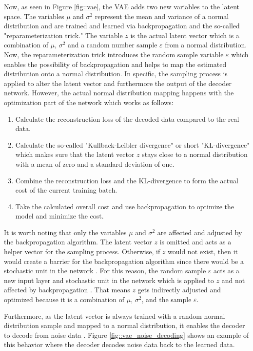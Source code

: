 \documentclass[MGS,Master,english]{twbook}%
\begin{document}
Now, as seen in Figure \ref{fig::vae}, the \ac{VAE} adds two new variables to the latent space. The variables $\mu$ and $\sigma^{2}$ represent the mean and variance of a normal distribution and are trained and learned via backpropagation and the so-called "reparameterization trick." The variable $z$ is the actual latent vector which is a combination of $\mu$, $\sigma^{2}$ and a random number sample $\varepsilon$ from a normal distribution. Now, the reparameterization trick introduces the random sample variable $\varepsilon$ which enables the possibility of backpropagation and helps to map the estimated distribution onto a normal distribution. In specific, the sampling process is applied to alter the latent vector and furthermore the output of the decoder network. However, the actual normal distribution mapping happens with the optimization part of the network which works as follows:
\begin{enumerate}
	\item Calculate the reconstruction loss of the decoded data compared to the real data.
	\item Calculate the so-called "Kullback-Leibler divergence" or short "KL-divergence" which makes sure that the latent vector $z$ stays close to a normal distribution with a mean of zero and a standard deviation of one.
	\item Combine the reconstruction loss and the KL-divergence to form the actual cost of the current training batch.
	\item Take the calculated overall cost and use backpropagation to optimize the model and minimize the cost.
\end{enumerate}

It is worth noting that only the variables $\mu$ and $\sigma^{2}$ are affected and adjusted by the backpropagation algorithm. The latent vector $z$ is omitted and acts as a helper vector for the sampling process. Otherwise, if $z$ would not exist, then it would create a barrier for the backpropagation algorithm since there would be a stochastic unit in the network \cite{ml::vae::tutorial}. For this reason, the random sample $\varepsilon$ acts as a new input layer and stochastic unit in the network which is applied to $z$ and not affected by backpropagation \cite{ml::vae::tutorial}. That means $z$ gets indirectly adjusted and optimized because it is a combination of $\mu$, $\sigma^{2}$, and the sample $\varepsilon$.

Furthermore, as the latent vector is always trained with a random normal distribution sample and mapped to a normal distribution, it enables the decoder to decode from noise data \cite{ml::vae::tutorial}. Figure \ref{fig::vae_noise_decoding} shows an example of this behavior where the decoder decodes noise data back to the learned data. 
\end{document}

